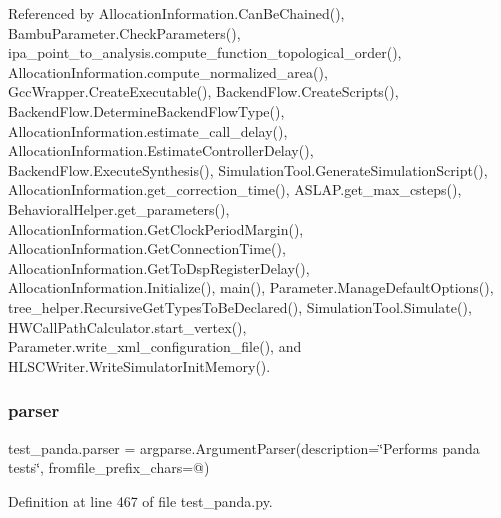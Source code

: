 Referenced by Allocation\+Information.\+Can\+Be\+Chained(), Bambu\+Parameter.\+Check\+Parameters(), ipa\+\_\+point\+\_\+to\+\_\+analysis.\+compute\+\_\+function\+\_\+topological\+\_\+order(), Allocation\+Information.\+compute\+\_\+normalized\+\_\+area(), Gcc\+Wrapper.\+Create\+Executable(), Backend\+Flow.\+Create\+Scripts(), Backend\+Flow.\+Determine\+Backend\+Flow\+Type(), Allocation\+Information.\+estimate\+\_\+call\+\_\+delay(), Allocation\+Information.\+Estimate\+Controller\+Delay(), Backend\+Flow.\+Execute\+Synthesis(), Simulation\+Tool.\+Generate\+Simulation\+Script(), Allocation\+Information.\+get\+\_\+correction\+\_\+time(), A\+S\+L\+A\+P.\+get\+\_\+max\+\_\+csteps(), Behavioral\+Helper.\+get\+\_\+parameters(), Allocation\+Information.\+Get\+Clock\+Period\+Margin(), Allocation\+Information.\+Get\+Connection\+Time(), Allocation\+Information.\+Get\+To\+Dsp\+Register\+Delay(), Allocation\+Information.\+Initialize(), main(), Parameter.\+Manage\+Default\+Options(), tree\+\_\+helper.\+Recursive\+Get\+Types\+To\+Be\+Declared(), Simulation\+Tool.\+Simulate(), H\+W\+Call\+Path\+Calculator.\+start\+\_\+vertex(), Parameter.\+write\+\_\+xml\+\_\+configuration\+\_\+file(), and H\+L\+S\+C\+Writer.\+Write\+Simulator\+Init\+Memory().

\mbox{\label{namespacetest__panda_a9be83b1904aaf2557970fcb731bd6d2e}} 
\subsubsection{\texorpdfstring{parser}{parser}}
{\footnotesize\ttfamily test\+\_\+panda.\+parser = argparse.\+Argument\+Parser(description=\char`\"{}Performs panda tests\char`\"{}, fromfile\+\_\+prefix\+\_\+chars=\textquotesingle{}@\textquotesingle{})}



Definition at line 467 of file test\+\_\+panda.\+py.



